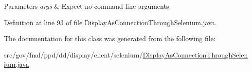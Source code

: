 \begin{DoxyParams}{Parameters}
{\em args} & Expect no command line arguments \\
\hline
\end{DoxyParams}


Definition at line 93 of file Display\-As\-Connection\-Through\-Selenium.\-java.



The documentation for this class was generated from the following file\-:\begin{DoxyCompactItemize}
\item 
src/gov/fnal/ppd/dd/display/client/selenium/\hyperlink{DisplayAsConnectionThroughSelenium_8java}{Display\-As\-Connection\-Through\-Selenium.\-java}\end{DoxyCompactItemize}
